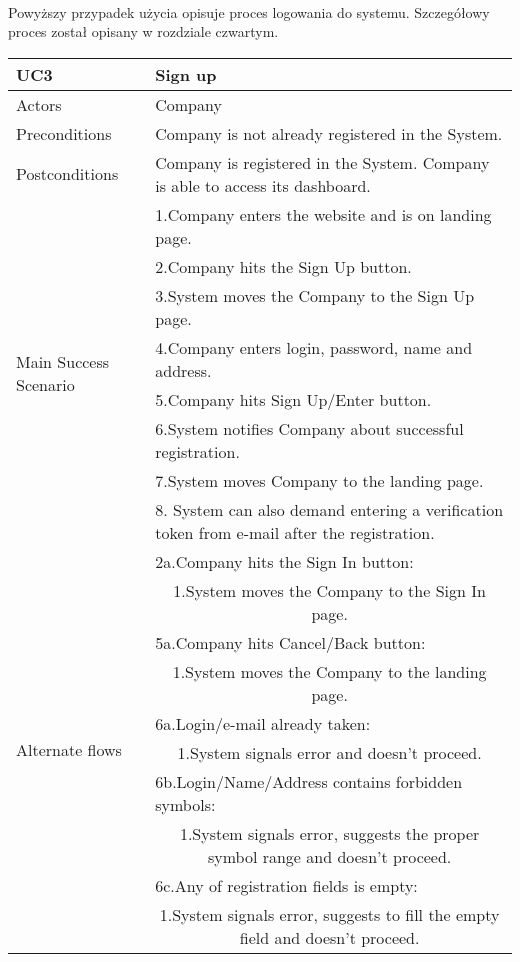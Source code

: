 \paragraph{}
Powyższy przypadek użycia opisuje proces logowania do systemu. Szczegółowy proces został opisany w rozdziale czwartym.
	
	\begin{table}[H]
	\centering
	\sffamily\captionsetup{justification=raggedright,singlelinecheck=false,position = below, font = sf}
	\begin{tabular}{|m{3.5cm}|m{11cm}|}
	\hline 
	UC3 & Sign up \\
	\hline
	Actors & Company \\
	\hline
	Preconditions & Company is not already registered in the System. \\
	\hline
	Postconditions & Company is registered in the System. Company is able to access its dashboard. \\	
	\hline
	\multirow{8}{*}{Main Success Scenario} & 1.Company enters the website and is on landing page. \\
	\cline{2-2}
	& 2.Company hits the Sign Up button. \\
	\cline{2-2}
	& 3.System moves the Company to the Sign Up page. \\
	\cline{2-2}
	& 4.Company enters login, password, name and address. \\
	\cline{2-2}
	& 5.Company hits Sign Up/Enter button. \\
	\cline{2-2}
	& 6.System notifies Company about successful registration. \\
	\cline{2-2}
	& 7.System moves Company to the landing page. \\
	\cline{2-2}
	& 8. System can also demand entering a verification token from e-mail after the registration. \\
	\hline
	\multirow{10}{*}{Alternate flows} & 2a.Company hits the Sign In button: \\
	\cline{2-2}
	& \multicolumn{1}{c|}{1.System moves the Company to the Sign In page.} \\
	\cline{2-2}
	& 5a.Company hits Cancel/Back button: \\
	\cline{2-2}
	& \multicolumn{1}{c|}{1.System moves the Company to the landing page.} \\
	\cline{2-2}
	& 6a.Login/e-mail already taken: \\
	\cline{2-2}
	& \multicolumn{1}{c|}{1.System signals error and doesn't proceed.} \\
	\cline{2-2}
	& 6b.Login/Name/Address contains forbidden symbols: \\
	\cline{2-2}
	& \multicolumn{1}{c|}{1.System signals error, suggests the proper symbol range and doesn't proceed.} \\
	\cline{2-2}
	& 6c.Any of registration fields is empty: \\
	\cline{2-2}
	& \multicolumn{1}{c|}{1.System signals error, suggests to fill the empty field and doesn't proceed.} \\
	\hline
	\end{tabular}
	\end{table}
	
